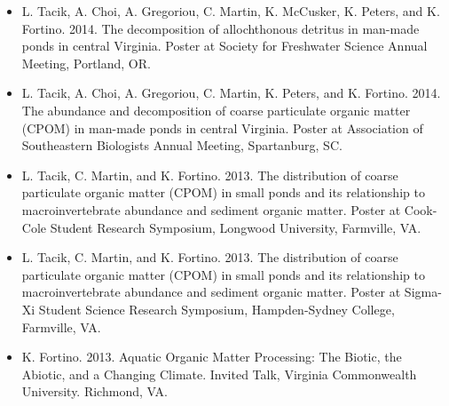 \documentclass{article}
\begin{document}
\begin{itemize}
  \item L. Tacik, A. Choi, A. Gregoriou, C. Martin, K. McCusker, K. Peters, and K. Fortino. 2014. The decomposition of allochthonous detritus in man-made ponds in central Virginia. Poster at Society for Freshwater Science Annual Meeting, Portland, OR.
  \item L. Tacik, A. Choi, A. Gregoriou, C. Martin, K. Peters, and K. Fortino. 2014. The abundance and decomposition of coarse particulate organic matter (CPOM) in man-made ponds in central Virginia. Poster at Association of Southeastern Biologists Annual Meeting, Spartanburg, SC.
  \item L. Tacik, C. Martin, and K. Fortino. 2013. The distribution of coarse particulate organic matter (CPOM) in small ponds and its relationship to macroinvertebrate abundance and sediment organic matter. Poster at Cook-Cole Student Research Symposium, Longwood University, Farmville, VA.
  \item L. Tacik, C. Martin, and K. Fortino. 2013. The distribution of coarse particulate organic matter (CPOM) in small ponds and its relationship to macroinvertebrate abundance and sediment organic matter. Poster at Sigma-Xi Student Science Research Symposium, Hampden-Sydney College, Farmville, VA.
  \item K. Fortino. 2013. Aquatic Organic Matter Processing: The Biotic, the Abiotic, and a Changing Climate. Invited Talk, Virginia Commonwealth University. Richmond, VA.
\end{itemize}
\end{document}
